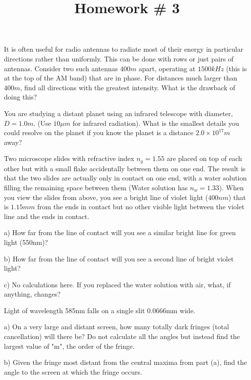 \documentclass[10pt]{article}
\newenvironment{problem}[2][Problem]{\begin{trivlist}
\item[\hskip \labelsep {\bfseries #1}\hskip \labelsep {\bfseries #2.}]}{\end{trivlist}}
\begin{document}
 \title{Homework \# 3}
\date{}
\maketitle

\begin{problem}{1}
It is often useful for radio antennas to radiate most of their energy in particular directions rather than uniformly. This can be done with rows or just pairs of antennas. Consider two such antennas $400m$ apart, operating at $1500kHz$ (this is at the top of the AM band) that are in phase. For distances much larger than $400m$, find all directions with the greatest intensity. What is the drawback of doing this?
\end{problem}
 


\begin{problem}{2}
You are studying a distant planet using an infrared telescope with diameter, $D=1.0m$. (Use $10\mu m$ for infrared radiation). What is the smallest details you could resolve on the planet if you know the planet is a distance $2.0\times10^{17}m$ away?
\end{problem}

\begin{problem}{3}
Two microscope slides with refractive index $n_g=1.55$ are placed on top of each other but with a small flake accidentally between them on one end. The result is that the two slides are actually only in contact on one end, with a water solution filling the remaining space between them (Water solution has $n_w=1.33$). When you view the slides from above, you see a bright line of violet light ($400nm$) that is $1.15mm$ from the ends in contact but no other visible light between the violet line and the ends in contact.
\item a) How far from the line of contact will you see a similar bright line for green light (550nm)?
\item b) How far from the line of contact will you see a second line of bright violet light?
\item c) No calculations here. If you replaced the water solution with air, what, if anything, changes?
\end{problem}






\begin{problem}{4}
Light of wavelength 585nm falls on a single slit 0.0666mm wide.
\item a) On a very large and distant screen, how many totally dark fringes (total cancellation) will there be? Do not calculate all the angles but instead find the largest value of "m", the order of the fringe.
\item b) Given the fringe most distant from the central maxima from part (a), find the angle to the screen at which the fringe occurs.
\end{problem}
\end{document}
